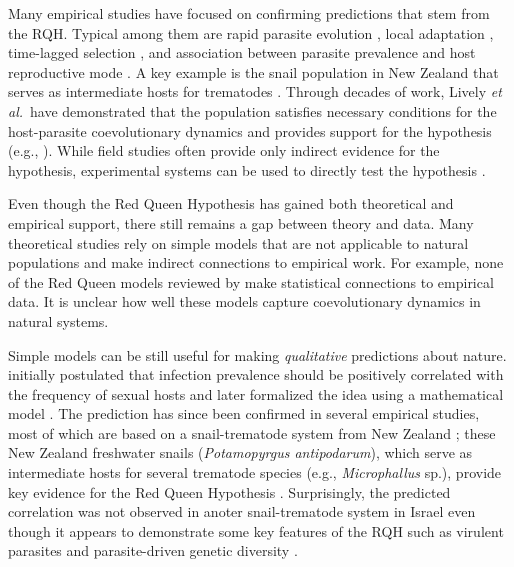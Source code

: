 \documentclass{article}\usepackage[]{graphicx}\usepackage[]{color}
\newcommand{\etal}{\textit{et al.}}
\begin{document}
Many empirical studies have focused on confirming predictions that stem from the RQH.
Typical among them are rapid parasite evolution \citep{rauch2006one}, local adaptation \citep{lively1989adaptation, morran2014experimental, king2009geographic, king2011coevolutionary, gibson2016within}, time-lagged selection \citep{buckling2002antagonistic, decaestecker2007host, koskella2009evidence, thrall2012rapid, koskella2013phage, koskella2014bacteria}, and association between parasite prevalence and host reproductive mode \citep{lively1992parthenogenesis, vergara2013geographic, verhoeven2013geographic}. 
A key example is the snail population in New Zealand that serves as intermediate hosts for trematodes \citep{winterbourn1974larval, mcarthur1976suppression}.
Through decades of work, Lively \etal\ have demonstrated that the population satisfies necessary conditions for the host-parasite coevolutionary dynamics and provides support for the hypothesis (e.g., \cite{lively1987evidence, lively1989adaptation, dybdahl1995host, dybdahl1998host, jokela2009maintenance, vergara2014infection, gibson2016within}).
While field studies often provide only indirect evidence for the hypothesis, 
experimental systems can be used to directly test the hypothesis \citep{morran2011running, auld2016sex, slowinski2016coevolutionary, lynch2018turnover, zilio2018effect}.

Even though the Red Queen Hypothesis has gained both theoretical and empirical support, there still remains a gap between theory and data.
Many theoretical studies rely on simple models that are not applicable to natural populations and make indirect connections to empirical work.
For example, none of the Red Queen models reviewed by \cite{ashby2015diversity} make statistical connections to empirical data.
It is unclear how well these models capture coevolutionary dynamics in natural systems.

Simple models can be still useful for making \emph{qualitative} predictions about 
nature.
\cite{lively1992parthenogenesis} initially postulated that infection prevalence should
be positively correlated with the frequency of sexual hosts and later formalized the
idea using a mathematical model \citep{lively2001trematode}.
The prediction has since been confirmed in several empirical studies, most of which 
are based on a snail-trematode system from New Zealand 
\citep{lively2002temporal, kumpulainen2004parasites, king2011parasites, vergara2013geographic, mckone2016fine, gibson2016within}; 
these New Zealand freshwater snails (\textit{Potamopyrgus antipodarum}), which serve 
as intermediate hosts for several trematode species (e.g., \textit{Microphallus} sp.), 
provide key evidence for the Red Queen Hypothesis
\citep{lively1987evidence, lively2001trematode, lively2002temporal, lively2004host, koskella2009evidence,
king2011coevolutionary, king2011parasites,
vergara2013geographic, vergara2014infection, mckone2016fine, gibson2018periodic}.
Surprisingly, the predicted correlation was not observed in anoter snail-trematode system in Israel \citep{heller1990sexual, ben2005spatial, ben2007temporal, ben2008sex, dagan2013clonal} even though it appears to demonstrate some key features of the RQH such as virulent parasites \citep{ben2005spatial} and parasite-driven genetic diversity \citep{dagan2013clonal}.
\end{document}
